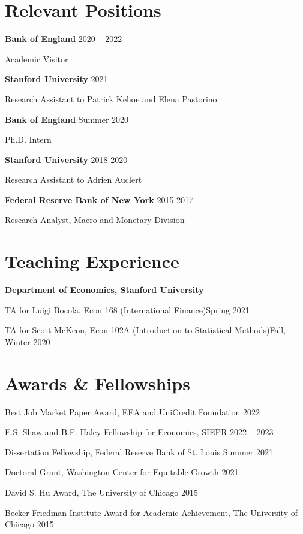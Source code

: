 \documentclass[margin,line]{res}                          %
\def\tinyskip{\vspace\tinyskipamount}
\newenvironment{list1}{
	\begin{list}{\ding{113}}{%
			\setlength{\itemsep}{0in}
			\setlength{\parsep}{0in} \setlength{\parskip}{0in}
			\setlength{\topsep}{0in} \setlength{\partopsep}{0in}
			\setlength{\leftmargin}{0.17in}}}{\end{list}}
\begin{document}
\begin{resume}
	\section{\sc Relevant Positions}
	\begin{list1}
		\item[] \textbf{Bank of England}  \hfill 2020 -- 2022\tinyskip
		\item[] {Academic Visitor}
		\smallskip
		\item[] \textbf{Stanford University}  \hfill 2021\tinyskip
		\item[] {Research Assistant to Patrick Kehoe and Elena Pastorino}
		\smallskip
		\item[] \textbf{Bank of England}  \hfill Summer 2020\tinyskip
		\item[] {Ph.D. Intern}
		\smallskip
		\item[] \textbf{Stanford University}  \hfill 2018-2020 \tinyskip
		\item[] {Research Assistant to Adrien Auclert}\smallskip
		\item[] \textbf{Federal Reserve Bank of New York}  \hfill 2015-2017 \tinyskip
		\item[] {Research Analyst, Macro and Monetary Division}
		
	\end{list1}
	
	\section{\sc Teaching Experience}
	\begin{list1}
		\item[] \textbf{Department of Economics, Stanford University} \smallskip
		\item[] TA for Luigi Bocola, Econ 168 (International Finance)\hfill Spring 2021\smallskip
		\item[] TA for Scott McKeon, Econ 102A (Introduction to Statistical Methods)\hfill Fall, Winter 2020\smallskip
	\end{list1}
	
	\section{\sc Awards \& Fellowships}
	\begin{list1}
		\item[] Best Job Market Paper Award, EEA and UniCredit Foundation
		 \hfill 2022\smallskip
		\item[] E.S. Shaw and B.F. Haley Fellowship for Economics, SIEPR \hfill 2022 -- 2023\smallskip
		\item[] Dissertation Fellowship, Federal Reserve Bank of St. Louis  \hfill Summer 2021\smallskip
		\item[] Doctoral Grant, Washington Center for Equitable Growth  \hfill 2021 \smallskip
		\item[] David S. Hu Award, The University of Chicago \hfill 2015\smallskip
		\item[] Becker Friedman Institute Award for Academic Achievement, The University of Chicago \hfill 2015\smallskip   
	\end{list1}
	

\end{resume}
\end{document}
